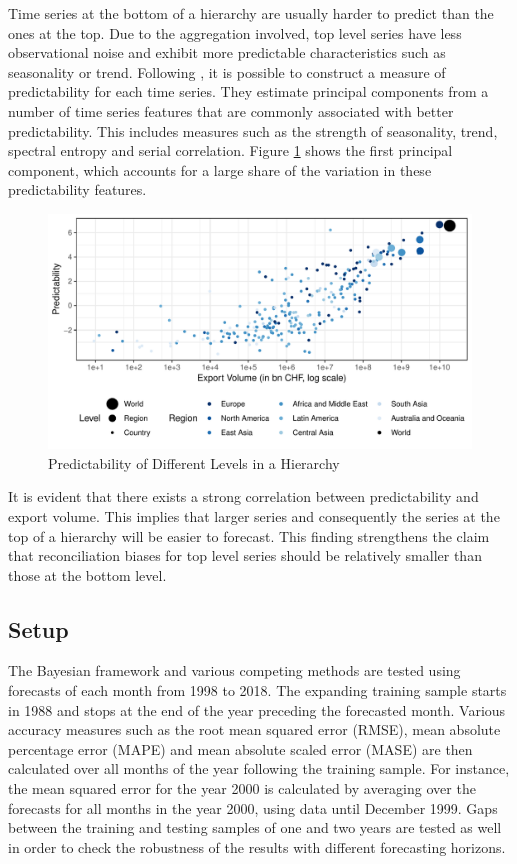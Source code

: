 \documentclass[a4paper,fleqn,11pt]{article}
\begin{document}
Time series at the bottom of a hierarchy are usually harder to predict than the ones at the top. Due to the aggregation involved, top level series have less observational noise and exhibit more predictable characteristics such as seasonality or trend. Following \cite{Kang2017}, it is possible to construct a measure of predictability for each time series. They estimate principal components from a number of time series features that are commonly associated with better predictability. This includes measures such as the strength of seasonality, trend, spectral entropy and serial correlation. Figure \ref{fig:feature} shows the first principal component, which accounts for a large share of the variation in these predictability features.
\begin{figure}[H]
	\includegraphics[width=\textwidth]{fig/fig_confetti}
	\caption{Predictability of Different Levels in a Hierarchy} \label{fig:feature}
\end{figure}
It is evident that there exists a strong correlation between predictability and export volume. This implies that larger series and consequently the series at the top of a hierarchy will be easier to forecast. This finding strengthens the claim that reconciliation biases for top level series should be relatively smaller than those at the bottom level.\\


\subsection{Setup}
The Bayesian framework and various competing methods are tested using forecasts of each month from 1998 to 2018. The expanding training sample starts in 1988 and stops at the end of the year preceding the forecasted month. Various accuracy measures such as the root mean squared error (RMSE), mean absolute percentage error (MAPE) and mean absolute scaled error (MASE) are then calculated over all months of the year following the training sample. For instance, the mean squared error for the year 2000 is calculated by averaging over the forecasts for all months in the year 2000, using data until December 1999. Gaps between the training and testing samples of one and two years are tested as well in order to check the robustness of the results with different forecasting horizons.\\
\end{document}
